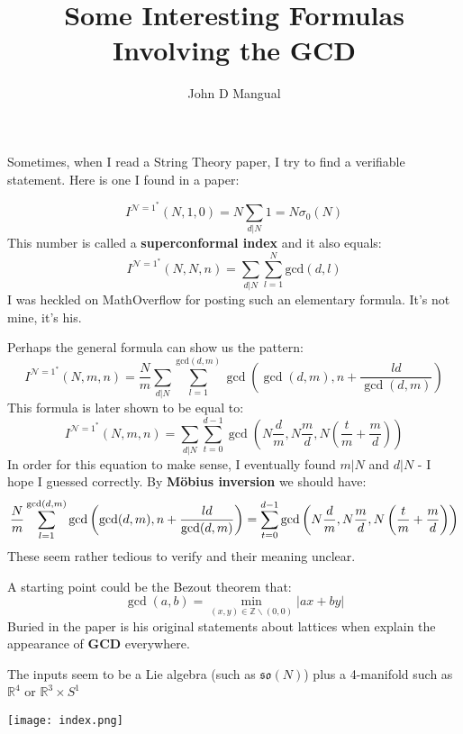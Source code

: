 \documentclass[12pt]{article}
\title{\textbf{ Some Interesting Formulas Involving the GCD }}
\author{John D Mangual}
\date{}
\begin{document}
\selectfont \fontsize{25}{30}\selectfont

\maketitle

Sometimes, when I read a String Theory paper, I try to find a verifiable statement.  Here is one I found in a paper:

$$ I^{\mathcal{N}=1^\ast}(N,1,0) = N \sum_{d| N} 1 = N \sigma_0(N) $$
This number is called a \textbf{superconformal index} and it also equals: 
$$ I^{\mathcal{N}=1^\ast}(N,N,n) =  \sum_{d| N} \sum_{l=1}^N \mathrm{gcd}(d,l ) $$
I was heckled on MathOverflow for posting such an elementary formula.  It's not mine, it's his.
\newpage

Perhaps the general formula can show us the pattern:
$$  I^{\mathcal{N}=1^\ast}(N,m,n) = \frac{N}{m} \sum_{d|N} \sum_{l=1}^{\mathrm{gcd}(d,m)}
\gcd\left( \gcd(d,m), n + \frac{ld}{\gcd(d,m)} \right)
$$
This formula is later shown to be equal to:
$$  I^{\mathcal{N}=1^\ast}(N,m,n) = 
 \sum_{d|N} \sum_{t=0}^{d-1} \gcd \left(N \frac{d}{m}, N \frac{m}{d}, N \left( \frac{t}{m} + \frac{m}{d} \right) \right)
$$
In order for this equation to make sense, I eventually found $m | N$ and $d | N$ - I hope I guessed correctly.  \newline \newline
By \textbf{M\"{o}bius inversion} we should have:
$$ \tiny \frac{N}{m}  \sum_{l=1}^{\mathrm{gcd}(d,m)}
\gcd\left( \gcd(d,m), n + \frac{ld}{\gcd(d,m)} \right)
= 
 \sum_{t=0}^{d-1} \gcd \left(N \frac{d}{m}, N \frac{m}{d}, N \left( \frac{t}{m} + \frac{m}{d} \right) \right)$$
These seem rather tedious to verify and their meaning unclear.

\newpage

A starting point could be the Bezout theorem that:
$$ \gcd(a,b) = \min_{(x,y) \in \mathbb{Z}\backslash{(0,0)}} |ax + by |$$
Buried in the paper is his original statements about lattices when explain the appearance of \textbf{GCD} everywhere.

\newpage

The inputs seem to be a Lie algebra (such as $\mathfrak{so}(N)$) plus a 4-manifold such as $\mathbb{R}^4$ or $\mathbb{R}^3\times S^1$ 

\texttt{[image: index.png]}

\newpage

\selectfont \fontsize{12}{10}\selectfont
\end{document}
